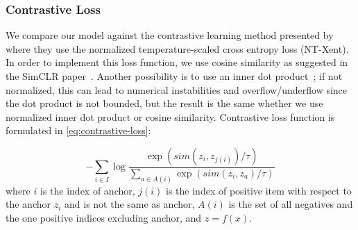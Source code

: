 \documentclass[10pt]{article} %
\newcommand{\todokdinline}[1]{\todo[color=red!20,inline]{{KD: \small #1}}}
\begin{document}

\subsubsection{Contrastive Loss}
\label{sub:baseline-contrastive}


We compare our model against the contrastive learning method presented by~\citet{chen2020simple} where they use the normalized
temperature-scaled cross entropy loss (NT-Xent). In order to implement this loss function, we use cosine similarity as suggested in the SimCLR paper~\citep{chen2020simple}. Another possibility is to use an inner dot product~\citep{NEURIPS2020_supervised_contrastive}; if not normalized, this can lead to numerical instabilities and overflow/underflow since the dot product is not bounded, but the result is the same whether we use normalized inner dot product or cosine similarity. Contrastive loss function is formulated in \cref{eq:contrastive-loss}:

\begin{equation}\label{eq:contrastive-loss}
    -\sum_{i \in I} \log \frac{\exp (sim(z_i , z_{j(i)}) / \tau) }{\sum_{a \in A(i)} \exp (sim(z_i, z_a) / \tau)}
\end{equation}
where $i$ is the index of anchor, $j(i)$ is the index of positive item with respect to the anchor $z_i$ and is not the same as anchor, $A(i)$ is the set of all negatives and the one positive indices excluding anchor, and $z = f(x)$.
\end{document}
